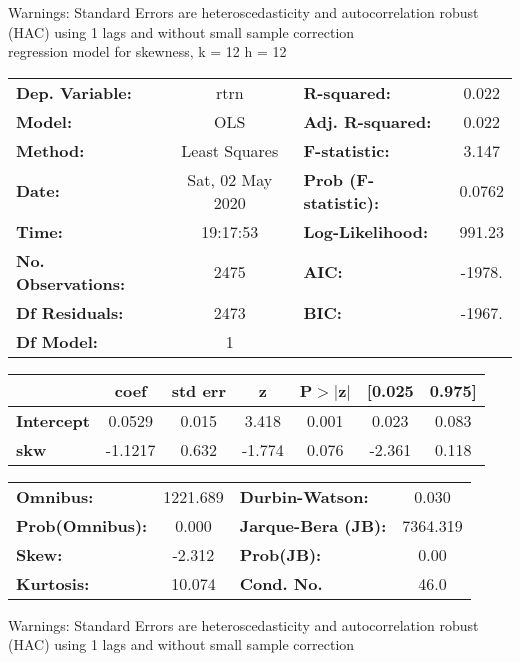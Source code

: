 Warnings: \newline
 [1] Standard Errors are heteroscedasticity and autocorrelation robust (HAC) using 1 lags and without small sample correction\\ 

regression model for skewness, k = 12 h = 12\begin{center}
\begin{tabular}{lclc}
\toprule
\textbf{Dep. Variable:}    &       rtrn       & \textbf{  R-squared:         } &     0.022   \\
\textbf{Model:}            &       OLS        & \textbf{  Adj. R-squared:    } &     0.022   \\
\textbf{Method:}           &  Least Squares   & \textbf{  F-statistic:       } &     3.147   \\
\textbf{Date:}             & Sat, 02 May 2020 & \textbf{  Prob (F-statistic):} &   0.0762    \\
\textbf{Time:}             &     19:17:53     & \textbf{  Log-Likelihood:    } &    991.23   \\
\textbf{No. Observations:} &        2475      & \textbf{  AIC:               } &    -1978.   \\
\textbf{Df Residuals:}     &        2473      & \textbf{  BIC:               } &    -1967.   \\
\textbf{Df Model:}         &           1      & \textbf{                     } &             \\
\bottomrule
\end{tabular}
\begin{tabular}{lcccccc}
                   & \textbf{coef} & \textbf{std err} & \textbf{z} & \textbf{P$> |$z$|$} & \textbf{[0.025} & \textbf{0.975]}  \\
\midrule
\textbf{Intercept} &       0.0529  &        0.015     &     3.418  &         0.001        &        0.023    &        0.083     \\
\textbf{skw}       &      -1.1217  &        0.632     &    -1.774  &         0.076        &       -2.361    &        0.118     \\
\bottomrule
\end{tabular}
\begin{tabular}{lclc}
\textbf{Omnibus:}       & 1221.689 & \textbf{  Durbin-Watson:     } &    0.030  \\
\textbf{Prob(Omnibus):} &   0.000  & \textbf{  Jarque-Bera (JB):  } & 7364.319  \\
\textbf{Skew:}          &  -2.312  & \textbf{  Prob(JB):          } &     0.00  \\
\textbf{Kurtosis:}      &  10.074  & \textbf{  Cond. No.          } &     46.0  \\
\bottomrule
\end{tabular}
\end{center}

Warnings: \newline
 [1] Standard Errors are heteroscedasticity and autocorrelation robust (HAC) using 1 lags and without small sample correction\\ 

